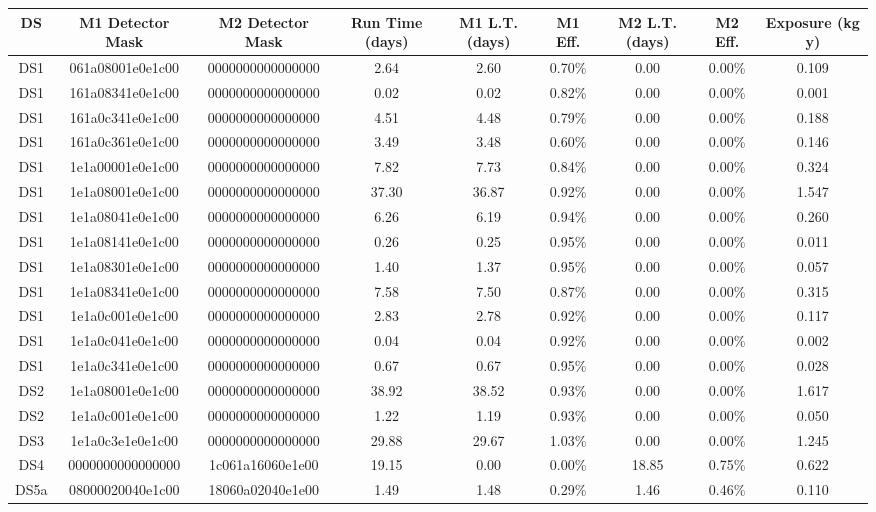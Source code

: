 \begin{tabular}{|c|c c|c|c c|c c|c|}
\hline
  DS & M1 Detector Mask & M2 Detector Mask & Run Time (days) & M1 L.T. (days) & M1 Eff. & M2 L.T. (days) & M2 Eff. & Exposure (kg y) \\
\hline
  DS1 & 061a08001e0e1c00 & 0000000000000000 & 2.64 & 2.60 & 0.70\% & 0.00 & 0.00\% & 0.109 \\
  DS1 & 161a08341e0e1c00 & 0000000000000000 & 0.02 & 0.02 & 0.82\% & 0.00 & 0.00\% & 0.001 \\
  DS1 & 161a0c341e0e1c00 & 0000000000000000 & 4.51 & 4.48 & 0.79\% & 0.00 & 0.00\% & 0.188 \\
  DS1 & 161a0c361e0e1c00 & 0000000000000000 & 3.49 & 3.48 & 0.60\% & 0.00 & 0.00\% & 0.146 \\
  DS1 & 1e1a00001e0e1c00 & 0000000000000000 & 7.82 & 7.73 & 0.84\% & 0.00 & 0.00\% & 0.324 \\
  DS1 & 1e1a08001e0e1c00 & 0000000000000000 & 37.30 & 36.87 & 0.92\% & 0.00 & 0.00\% & 1.547 \\
  DS1 & 1e1a08041e0e1c00 & 0000000000000000 & 6.26 & 6.19 & 0.94\% & 0.00 & 0.00\% & 0.260 \\
  DS1 & 1e1a08141e0e1c00 & 0000000000000000 & 0.26 & 0.25 & 0.95\% & 0.00 & 0.00\% & 0.011 \\
  DS1 & 1e1a08301e0e1c00 & 0000000000000000 & 1.40 & 1.37 & 0.95\% & 0.00 & 0.00\% & 0.057 \\
  DS1 & 1e1a08341e0e1c00 & 0000000000000000 & 7.58 & 7.50 & 0.87\% & 0.00 & 0.00\% & 0.315 \\
  DS1 & 1e1a0c001e0e1c00 & 0000000000000000 & 2.83 & 2.78 & 0.92\% & 0.00 & 0.00\% & 0.117 \\
  DS1 & 1e1a0c041e0e1c00 & 0000000000000000 & 0.04 & 0.04 & 0.92\% & 0.00 & 0.00\% & 0.002 \\
  DS1 & 1e1a0c341e0e1c00 & 0000000000000000 & 0.67 & 0.67 & 0.95\% & 0.00 & 0.00\% & 0.028 \\
  DS2 & 1e1a08001e0e1c00 & 0000000000000000 & 38.92 & 38.52 & 0.93\% & 0.00 & 0.00\% & 1.617 \\
  DS2 & 1e1a0c001e0e1c00 & 0000000000000000 & 1.22 & 1.19 & 0.93\% & 0.00 & 0.00\% & 0.050 \\
  DS3 & 1e1a0c3e1e0e1c00 & 0000000000000000 & 29.88 & 29.67 & 1.03\% & 0.00 & 0.00\% & 1.245 \\
  DS4 & 0000000000000000 & 1c061a16060e1e00 & 19.15 & 0.00 & 0.00\% & 18.85 & 0.75\% & 0.622 \\
  DS5a & 08000020040e1c00 & 18060a02040e1e00 & 1.49 & 1.48 & 0.29\% & 1.46 & 0.46\% & 0.110 \\

\end{tabular}
